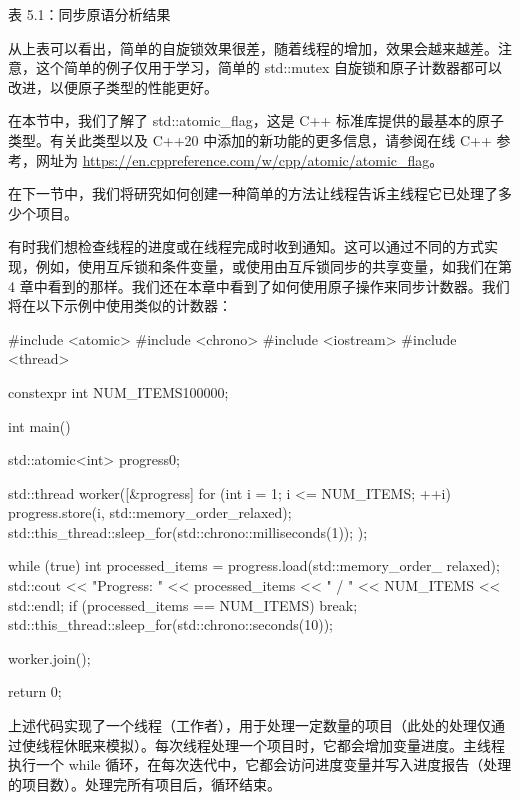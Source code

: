 \begin{center}
表 5.1：同步原语分析结果
\end{center}

从上表可以看出，简单的自旋锁效果很差，随着线程的增加，效果会越来越差。注意，这个简单的例子仅用于学习，简单的 std::mutex 自旋锁和原子计数器都可以改进，以便原子类型的性能更好。

在本节中，我们了解了 std::atomic\_flag，这是 C++ 标准库提供的最基本的原子类型。有关此类型以及 C++20 中添加的新功能的更多信息，请参阅在线 C++ 参考，网址为 \url{https://en.cppreference.com/w/cpp/atomic/atomic_flag}。

在下一节中，我们将研究如何创建一种简单的方法让线程告诉主线程它已处理了多少个项目。


有时我们想检查线程的进度或在线程完成时收到通知。这可以通过不同的方式实现，例如，使用互斥锁和条件变量，或使用由互斥锁同步的共享变量，如我们在第 4 章中看到的那样。我们还在本章中看到了如何使用原子操作来同步计数器。我们将在以下示例中使用类似的计数器：

\begin{cpp}
#include <atomic>
#include <chrono>
#include <iostream>
#include <thread>

constexpr int NUM_ITEMS{100000};

int main() {
    std::atomic<int> progress{0};

    std::thread worker([&progress] {
        for (int i = 1; i <= NUM_ITEMS; ++i) {
            progress.store(i, std::memory_order_relaxed);
            std::this_thread::sleep_for(std::chrono::milliseconds(1));
        }
    });

    while (true) {
        int processed_items = progress.load(std::memory_order_
        relaxed);
        std::cout << "Progress: "
                  << processed_items << " / " << NUM_ITEMS
                  << std::endl;
        if (processed_items == NUM_ITEMS) {
            break;
        }
        std::this_thread::sleep_for(std::chrono::seconds(10));
    }

    worker.join();

    return 0;
}
\end{cpp}

上述代码实现了一个线程（工作者），用于处理一定数量的项目（此处的处理仅通过使线程休眠来模拟）。每次线程处理一个项目时，它都会增加变量进度。主线程执行一个 while 循环，在每次迭代中，它都会访问进度变量并写入进度报告（处理的项目数）。处理完所有项目后，循环结束。

